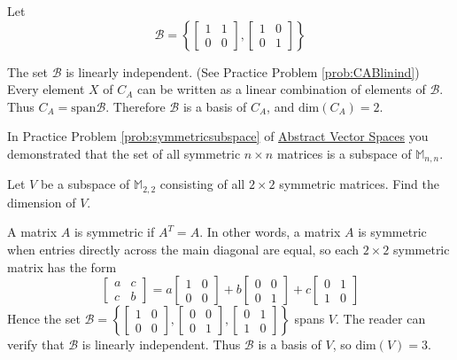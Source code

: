\documentclass{ximera}
\begin{document}
\begin{example}
\begin{explanation}
Let 
$$\mathcal{B}=\left\{\begin{bmatrix}1&1\\0&0\end{bmatrix},\begin{bmatrix}1&0\\0&1\end{bmatrix}\right\}$$

The set $\mathcal{B}$ is linearly independent. (See Practice Problem \ref{prob:CABlinind}) Every element $X$ of $C_A$ can be written as a linear combination of elements of $\mathcal{B}$.  Thus $C_A=\mbox{span}\mathcal{B}$.
 Therefore $\mathcal{B}$ is a basis of $C_A$, and $\mbox{dim}(C_A) = 2$.
\end{explanation}
\end{example}

\begin{example}\label{ex:symmetricmatsubspace} 
In Practice Problem \ref{prob:symmetricsubspace} of \href{https://ximera.osu.edu/linearalgebradzv3/LinearAlgebraInteractiveIntro/VSP-0050/main}{Abstract Vector Spaces} you demonstrated that the set of all symmetric $n\times n$ matrices is a subspace of $\mathbb{M}_{n,n}$.

Let $V$ be a subspace of $\mathbb{M}_{2,2}$ consisting of all $2\times 2$ symmetric matrices.  Find the dimension of $V$.

\begin{explanation}
A matrix $A$ is symmetric if $A^{T} = A$. In other words, a matrix $A$ is symmetric when entries directly across the main diagonal are equal, so each $2 \times 2$ symmetric matrix has the form
$$
\begin{bmatrix}
a & c \\
c & b
\end{bmatrix}
= a\begin{bmatrix}
1 & 0 \\
0 & 0
\end{bmatrix}
+ b\begin{bmatrix}
0 & 0 \\
0 & 1
\end{bmatrix}
+ c\begin{bmatrix}
0 & 1 \\
1 & 0
\end{bmatrix}
$$
Hence the set 
$\mathcal{B} = \left\{
\begin{bmatrix}
1 & 0 \\
0 & 0
\end{bmatrix}, \begin{bmatrix}
0 & 0 \\
0 & 1
\end{bmatrix}, \begin{bmatrix}
0 & 1 \\
1 & 0
\end{bmatrix}
\right\}$
 spans $V$. The reader can verify that $\mathcal{B}$ is linearly independent. Thus $\mathcal{B}$ is a basis of $V$, so $\mbox{dim}(V) = 3$.
\end{explanation}
\end{example}
\end{document}
